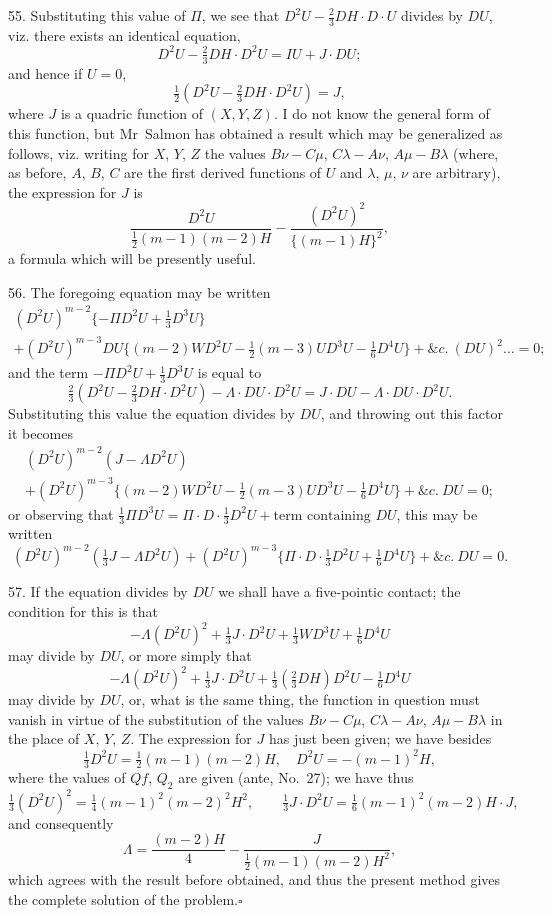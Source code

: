 \documentclass[11pt,a4paper]{book}
\begin{document}
55. Substituting this value of $\Pi$, we see that $D^2U-\tfrac{2}{3}DH\cdot D\cdot U$ divides by $DU$, viz. there exists an identical equation,
\[
D^2U-\tfrac{2}{3}DH\cdot D^2U=IU+J\cdot DU;
\]
and hence if $U=0$,
\[
\tfrac{1}{2}(D^2U-\tfrac{2}{3}DH\cdot D^2U)=J,
\]
where $J$ is a quadric function of $(X,Y,Z)$. I do not know the general form of this function, but Mr~Salmon has obtained a result which may be generalized as follows, viz. writing for $X$, $Y$, $Z$ the values $B\nu-C\mu$, $C\lambda-A\nu$, $A\mu-B\lambda$ (where, as before, $A$, $B$, $C$ are the first derived functions of $U$ and $\lambda$, $\mu$, $\nu$ are arbitrary), the expression for $J$ is
\[
\frac{D^2U}{\tfrac{1}{2}(m-1)(m-2)H}-\frac{(D^2U)^2}{\{(m-1)H\}^2},
\]
a formula which will be presently useful.

56. The foregoing equation may be written
\begin{multline*}
(D^2U)^{m-2}\{-\Pi D^2U+\tfrac{1}{3}D^3U\}\\
+(D^2U)^{m-3}DU\{(m-2)W D^2U-\tfrac{1}{2}(m-3)UD^3U-\tfrac{1}{6}D^4U\}+\&c.\ (DU)^2\ldots=0;
\end{multline*}
and the term $-\Pi D^2U+\tfrac{1}{3}D^3U$ is equal to
\[
\tfrac{2}{3}(D^2U-\tfrac{2}{3}DH\cdot D^2U)-\Lambda\cdot DU\cdot D^2U=J\cdot DU-\Lambda\cdot DU\cdot D^2U.
\]
Substituting this value the equation divides by $DU$, and throwing out this factor it becomes
\begin{multline*}
(D^2U)^{m-2}(J-\Lambda D^2U)\\
+(D^2U)^{m-3}\{(m-2)W D^2U-\tfrac{1}{2}(m-3)UD^3U-\tfrac{1}{6}D^4U\}+\&c.\ DU=0;
\end{multline*}
or observing that $\tfrac{1}{3}\Pi D^3U=\Pi\cdot D\cdot\tfrac{1}{3}D^2U+\text{term containing }DU$, this may be written
\[
(D^2U)^{m-2}(\tfrac{1}{3}J-\Lambda D^2U)+(D^2U)^{m-3}\{\Pi\cdot D\cdot\tfrac{1}{3}D^2U+\tfrac{1}{6}D^4U\}+\&c.\ DU=0.
\]

57. If the equation divides by $DU$ we shall have a five-pointic contact; the condition for this is that
\[
-\Lambda(D^2U)^2+\tfrac{1}{3}J\cdot D^2U+\tfrac{1}{3}W D^3U+\tfrac{1}{6}D^4U
\]
may divide by $DU$, or more simply that
\[
-\Lambda(D^2U)^2+\tfrac{1}{3}J\cdot D^2U+\tfrac{1}{3}(\tfrac{2}{3}DH)D^2U-\tfrac{1}{6}D^4U
\]
may divide by $DU$, or, what is the same thing, the function in question must vanish in virtue of the substitution of the values $B\nu-C\mu$, $C\lambda-A\nu$, $A\mu-B\lambda$ in the place of $X$, $Y$, $Z$. The expression for $J$ has just been given; we have besides
\[
\tfrac{1}{3}D^2U=\tfrac{1}{2}(m-1)(m-2)H,\quad D^2U=-(m-1)^2H,
\]
where the values of $Q\!f$, $Q_2$ are given (ante, No.~27); we have thus
\[
\tfrac{1}{3}(D^2U)^2=\tfrac{1}{4}(m-1)^2(m-2)^2H^2,\qquad \tfrac{1}{3}J\cdot D^2U=\tfrac{1}{6}(m-1)^2(m-2)H\cdot J,
\]
and consequently
\[
\Lambda=\frac{(m-2)H}{4}-\frac{J}{\tfrac{1}{2}(m-1)(m-2)H^2},
\]
which agrees with the result before obtained, and thus the present method gives the complete solution of the problem.\hfill$\square$
\end{document}

